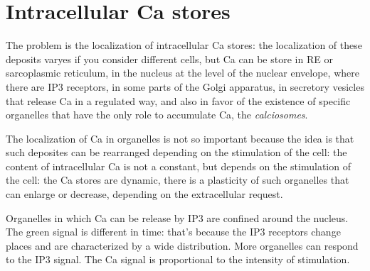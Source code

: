 \documentclass[a4paper, 12pt]{book}
\begin{document}
\section{Intracellular Ca stores}
The problem is the localization of intracellular Ca stores: the localization of these deposits varyes if you consider different cells, but Ca can be store in RE or sarcoplasmic reticulum, in the nucleus at the level of the nuclear envelope, where there are IP3 receptors, in some parts of the Golgi apparatus, in secretory vesicles that release Ca in a regulated way, and also in favor of the existence of specific organelles that have the only role to accumulate Ca, the \emph{calciosomes}. 

The localization of Ca in organelles is not so important because the idea is that such deposites can be rearranged depending on the stimulation of the cell: the content of intracellular Ca is not a constant, but depends on the stimulation of the cell: the Ca stores are dynamic, there is a plasticity of such organelles that can enlarge or decrease, depending on the extracellular request.

Organelles in which Ca can be release by IP3 are confined around the nucleus. The green signal is different in time: that's because the IP3 receptors change places and are characterized by a wide distribution. More organelles can respond to the IP3 signal. The Ca signal is proportional to the intensity of stimulation. 
\end{document}

